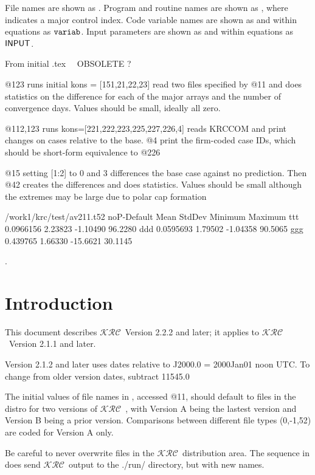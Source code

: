 \documentclass{article}  %
\newcommand{\krc}{$\mathcal{KRC}$~}    %
\begin{document}
File names are shown as . 
Program and routine names are shown as  , where 
indicates a major control index. 
Code variable names are shown as  and within equations as $\mathtt{varia
b}$.  
Input parameters are shown as  and within equations as $\mathsf{INPUT}$.


\hrulefill  From initial .tex \ \ OBSOLETE ? \hrulefill

@123 runs initial kons = [151,21,22,23] read two files specified by @11
 and does statistics on the difference for each of the major arrays and
the number of convergence days. Values should be small, ideally all zero.


@112,123 runs kons=[221,222,223,225,227,226,4] reads KRCCOM and print changes on
cases relative to the base. @4 print the firm-coded case IDs, which should be
short-form equivalence to @226

@15 setting [1:2] to 0 and 3 differences the base case against no prediction. Then @42 creates the differences and does statistics.   Values should be small although the extremes may be large due to polar cap formation 


/work1/krc/test/av211.t52  noP-Default
           Mean       StdDev      Minimum      Maximum
ttt    0.0966156      2.23823     -1.10490      96.2280
ddd    0.0595693      1.79502     -1.04358      90.5065
ggg     0.439765      1.66330     -15.6621      30.1145

\hrulefill .\hrulefill

\section{Introduction} 
This document describes \krc Version 2.2.2 and later; it applies to \krc Version
2.1.1 and later.

Version 2.1.2 and later uses dates relative to J2000.0 = 2000Jan01 noon UTC. To
change from older version dates, subtract 11545.0

The initial values of file names in , accessed @11, should default to
files in the distro for two versions of \krc, with Version A being the lastest
version and Version B being a prior version.  Comparisons between different file
types (0,-1,52) are coded for Version A only.

Be careful to never overwrite files in the \krc distribution area. The sequence
in  does send \krc output to the ./run/ directory, but with new
names.
\end{document}
